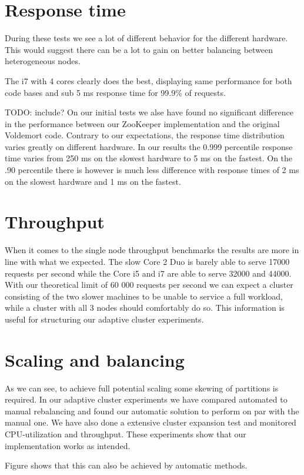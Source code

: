 \section{Response time}
During these tests we see a lot of different behavior for the different hardware. This would suggest there can be a lot to gain on better balancing between heterogeneous nodes.


The i7 with 4 cores clearly does the best, displaying same performance for both code bases and sub 5 ms response time for 99.9\% of requests.

TODO: include?
On our initial tests we alse have found no significant difference in the performance between our ZooKeeper implementation and the original Voldemort code. Contrary to our expectations, the response time distribution varies greatly on different hardware. In our results the 0.999 percentile response time varies from 250 ms on the slowest hardware to 5 ms on the fastest. On the .90 percentile there is however is much less difference with response times of 2 ms on the slowest hardware and 1 ms on the fastest.

\section{Throughput}
\label{eval:throughput}
When it comes to the single node throughput benchmarks the results are more in line with what we expected. The slow Core 2 Duo is barely able to serve 17000 requests per second while the Core i5 and i7 are able to serve 32000 and 44000. With our theoretical limit of 60 000 requests per second we can expect a cluster consisting of the two slower machines to be unable to service a full workload, while a cluster with all 3 nodes should comfortably do so. This information is useful for structuring our adaptive cluster experiments.

\section{Scaling and balancing}
\label{eval:balance}
As we can see, to achieve full potential scaling some skewing of partitions is required. In our adaptive cluster experiments we have compared automated to manual rebalancing and found our automatic solution to perform on par with the manual one. We have also done a extensive cluster expansion test and monitored CPU-utilization and throughput. These experiments show that our implementation works as intended.

Figure shows that this can also be achieved by automatic methods.

